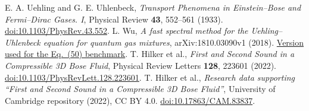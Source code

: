  E. A. Uehling and G. E. Uhlenbeck,
\emph{Transport Phenomena in Einstein--Bose and Fermi--Dirac Gases. I},
Physical Review \textbf{43}, 552--561 (1933).
\href{https://doi.org/10.1103/PhysRev.43.552}{doi:10.1103/PhysRev.43.552}.
 L. Wu,
\emph{A fast spectral method for the Uehling--Uhlenbeck equation for quantum
gas mixtures}, arXiv:1810.03090v1 (2018).
\href{https://arxiv.org/abs/1810.03090v1}{Version used for the Eq.~(50) benchmark}.
 T. Hilker et al.,
\emph{First and Second Sound in a Compressible 3D Bose Fluid},
Physical Review Letters \textbf{128}, 223601 (2022).
\href{https://doi.org/10.1103/PhysRevLett.128.223601}{doi:10.1103/PhysRevLett.128.223601}.
 T. Hilker et al.,
\emph{Research data supporting ``First and Second Sound in a Compressible
3D Bose Fluid''}, University of Cambridge repository (2022), CC BY 4.0.
\href{https://doi.org/10.17863/CAM.83837}{doi:10.17863/CAM.83837}.
